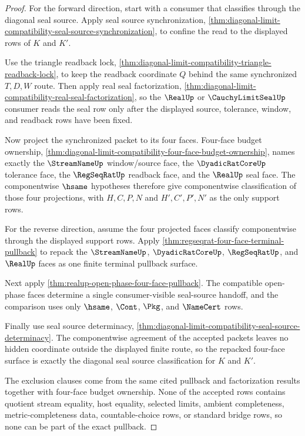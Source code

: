 \begin{proof}
For the forward direction, start with a consumer that classifies through the
diagonal seal source. Apply seal source synchronization,
\autoref{thm:diagonal-limit-compatibility-seal-source-synchronization}, to
confine the read to the displayed rows of $K$ and $K'$.

Use the triangle readback lock,
\autoref{thm:diagonal-limit-compatibility-triangle-readback-lock}, to keep the
readback coordinate $Q$ behind the same synchronized $T,D,W$ route. Then apply
real seal factorization,
\autoref{thm:diagonal-limit-compatibility-real-seal-factorization}, so the
$\RealUp$ or $\CauchyLimitSealUp$ consumer reads the seal row only after the
displayed source, tolerance, window, and readback rows have been fixed.

Now project the synchronized packet to its four faces. Four-face budget
ownership,
\autoref{thm:diagonal-limit-compatibility-four-face-budget-ownership}, names
exactly the $\StreamNameUp$ window/source face, the $\DyadicRatCoreUp$ tolerance
face, the $\RegSeqRatUp$ readback face, and the $\RealUp$ seal face. The
componentwise $\hsame$ hypotheses therefore give componentwise classification
of those four projections, with $H,C,P,N$ and $H',C',P',N'$ as the only support
rows.

For the reverse direction, assume the four projected faces classify
componentwise through the displayed support rows. Apply
\autoref{thm:regseqrat-four-face-terminal-pullback} to repack the
$\StreamNameUp$, $\DyadicRatCoreUp$, $\RegSeqRatUp$, and $\RealUp$ faces as one
finite terminal pullback surface.

Next apply \autoref{thm:realup-open-phase-four-face-pullback}. The compatible
open-phase faces determine a single consumer-visible seal-source handoff, and
the comparison uses only $\hsame$, $\Cont$, $\Pkg$, and $\NameCert$ rows.

Finally use seal source determinacy,
\autoref{thm:diagonal-limit-compatibility-seal-source-determinacy}. The
componentwise agreement of the accepted packets leaves no hidden coordinate
outside the displayed finite route, so the repacked four-face surface is exactly
the diagonal seal source classification for $K$ and $K'$.

The exclusion clauses come from the same cited pullback and factorization
results together with four-face budget ownership. None of the accepted rows
contains quotient stream equality, host equality, selected limits, ambient
completeness, metric-completeness data, countable-choice rows, or standard
bridge rows, so none can be part of the exact pullback.
\end{proof}

